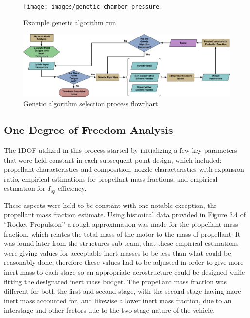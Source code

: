 \begin{figure}
    \centering
    \texttt{[image: images/genetic-chamber-pressure]}
    \caption{Example genetic algorithm run}
    \label{figure:genetic-chamber-pressure}
\end{figure}


\begin{figure}
    \centering
    \includegraphics[width=\linewidth]{images/genetic-flowchart}
    \caption{Genetic algorithm selection process flowchart}
    \label{figure:genetic-flowchart}
\end{figure}


\subsection{One Degree of Freedom Analysis}
The 1DOF utilized in this process started by initializing a few key parameters that were held constant in each subsequent point design, which included: propellant characteristics and composition, nozzle characteristics with expansion ratio, empirical estimations for propellant mass fractions, and empirical estimation for \(I_{sp}\) efficiency.

These aspects were held to be constant with one notable exception, the propellant mass fraction estimate. Using historical data provided in Figure 3.4 of ``Rocket Propulsion'' \cite{heister-rocket-propulsion} a rough approximation was made for the propellant mass fraction, which relates the total mass of the motor to the mass of propellant. It was found later from the structures sub team, that these empirical estimations were giving values for acceptable inert masses to be less than what could be reasonably done, therefore these values had to be adjusted in order to give more inert mass to each stage so an appropriate aerostructure could be designed while fitting the designated inert mass budget. The propellant mass fraction was different for both the first and second stage, with the second stage having more inert mass accounted for, and likewise a lower inert mass fraction, due to an interstage and other factors due to the two stage nature of the vehicle.

